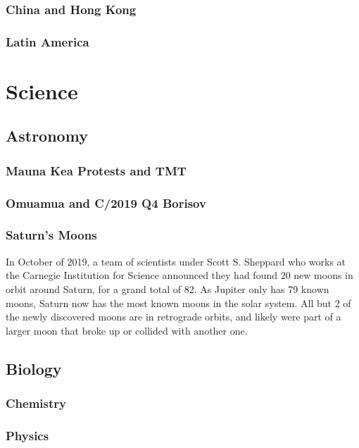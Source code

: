 			\subsubsection{China and Hong Kong}
			\subsubsection{Latin America}
	\section{Science}
		\subsection{Astronomy}
			\subsubsection{Mauna Kea Protests and TMT}
			\subsubsection{Omuamua and C/2019 Q4 Borisov}
			\subsubsection{Saturn's Moons}
				In October of 2019, a team of scientists under Scott S. Sheppard who works at the Carnegie Institution for Science announced they had found 20 new moons in orbit around Saturn, for a grand total of 82. As Jupiter only has 79 known moons, Saturn now has the most known moons in the solar system.  All but 2 of the newly discovered moons are in retrograde orbits, and likely were part of a larger moon that broke up or collided with another one. 
		\subsection{Biology}
		\subsubsection{Chemistry}
		\subsubsection{Physics}
		